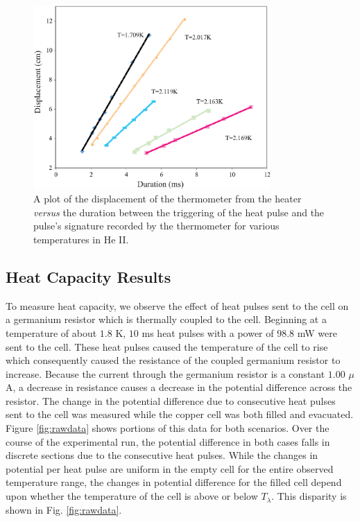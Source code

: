 \begin{figure}[htbp]
\begin{center}
\includegraphics[height=70mm]{./figures/secondsoundraw.eps}
\caption{\small{A plot of the displacement of the thermometer from the heater \emph{versus} the duration between the triggering of the heat pulse and the pulse's signature recorded by the thermometer for various temperatures in He II.}}
\label{fig:secondsoundraw}
\end{center}
\end{figure}


\subsection{Heat Capacity Results}\label{heatcapacityresults}

To measure heat capacity, we observe the effect of heat pulses sent to the cell on a germanium resistor which is thermally coupled to the cell. Beginning at a temperature of about $1.8$ K, $10$ ms heat pulses with a power of $98.8$ mW were sent to the cell.  These heat pulses caused the temperature of the cell to rise which consequently caused the resistance of the coupled germanium resistor to increase.  Because the current through the germanium resistor is a constant $1.00$ $\mu$A, a decrease in resistance causes a decrease in the potential difference across the resistor. The change in the potential difference due to consecutive heat pulses sent to the cell was measured while the copper cell was both filled and evacuated. Figure \ref{fig:rawdata} shows portions of this data for both scenarios.  Over the course of the experimental run, the potential difference in both cases falls in discrete sections due to the consecutive heat pulses. While the changes in potential per heat pulse are uniform in the empty cell for the entire observed temperature range, the changes in potential difference for the filled cell depend upon whether the temperature of the cell is above or below $T_{\lambda}$. This disparity is shown in Fig. \ref{fig:rawdata}. 

